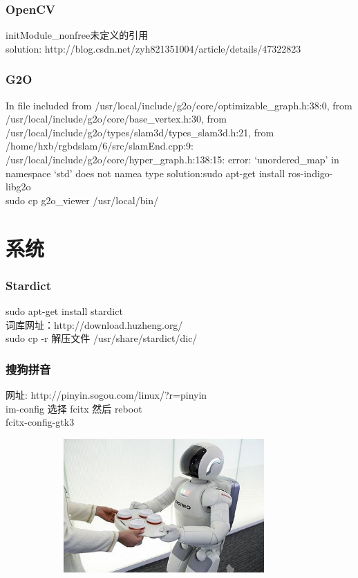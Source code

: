 \documentclass{beamer}
\begin{document}
\begin{CJK}{UTF8}{gkai}
 \begin{frame}\frametitle{OpenCV}
     initModule\_nonfree未定义的引用\\
     solution: http://blog.csdn.net/zyh821351004/article/details/47322823
 \end{frame}

 \begin{frame}\frametitle{G2O}
     In file included from /usr/local/include/g2o/core/optimizable\_graph.h:38:0,
                from /usr/local/include/g2o/core/base\_vertex.h:30,
                from /usr/local/include/g2o/types/slam3d/types\_slam3d.h:21,
                from /home/hxb/rgbdslam/6/src/slamEnd.cpp:9:
     /usr/local/include/g2o/core/hyper\_graph.h:138:15: error:
     ‘unordered\_map’ in namespace ‘std’ does not namea type
   solution:sudo apt-get install ros-indigo-libg2o\\
   sudo cp g2o\_viewer /usr/local/bin/
 \end{frame}

\section{系统}

 \begin{frame}\frametitle{Stardict}
   sudo apt-get install stardict\\
   词库网址：http://download.huzheng.org/\\
   sudo cp -r 解压文件 /usr/share/stardict/dic/
 \end{frame}

 \begin{frame}\frametitle{搜狗拼音}
   网址: http://pinyin.sogou.com/linux/?r=pinyin\\
   im-config 选择 fcitx 然后 reboot\\
   fcitx-config-gtk3\\
   \begin{figure}
     \centering
     \includegraphics[width=10.00cm,height=5.10cm]{test.png}
   \end{figure}
 \end{frame}


\end{CJK}
\end{document}
